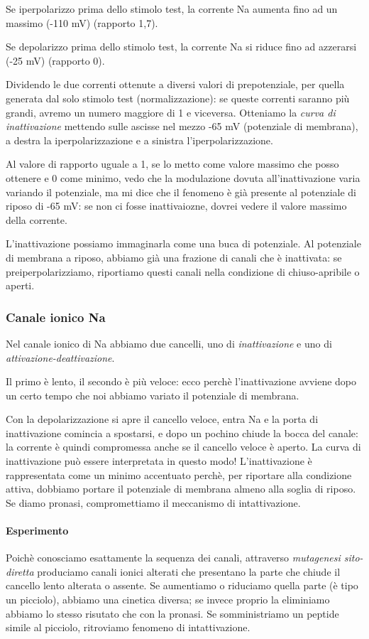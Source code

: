 \documentclass[a4paper,12pt]{article}
\begin{document}
Se iperpolarizzo prima dello stimolo test, la corrente Na aumenta fino ad un massimo (-110 mV) (rapporto 1,7).

Se depolarizzo prima dello stimolo test, la corrente Na si riduce fino ad azzerarsi (-25 mV) (rapporto 0).

Dividendo le due correnti ottenute a diversi valori di prepotenziale, per quella generata dal solo stimolo test  (normalizzazione): se queste correnti saranno più grandi, avremo un numero maggiore di 1 e viceversa.
Otteniamo la \emph{curva di inattivazione} mettendo sulle ascisse nel mezzo -65 mV (potenziale di membrana), a destra la iperpolarizzazione e a sinistra l'iperpolarizzazione.

Al valore di rapporto uguale a 1, se lo metto come valore massimo che posso ottenere e 0 come minimo, vedo che la modulazione dovuta all'inattivazione varia variando il potenziale,  ma mi dice che il fenomeno è già presente al potenziale di riposo di -65 mV: se non ci fosse inattivaiozne, dovrei vedere il valore massimo della corrente.

L'inattivazione possiamo immaginarla come una buca di potenziale. Al potenziale di membrana a riposo, abbiamo già una frazione di canali che è inattivata: se preiperpolarizziamo, riportiamo questi canali nella condizione di chiuso-apribile o aperti.

\subsubsection{Canale ionico Na}
Nel canale ionico di Na abbiamo due cancelli, uno di \emph{inattivazione} e uno di \emph{attivazione-deattivazione}.

Il primo è lento, il secondo è più veloce: ecco perchè l'inattivazione avviene dopo un certo tempo che noi abbiamo variato il potenziale di membrana.

Con la depolarizzazione si apre il cancello veloce, entra Na e la porta di inattivazione comincia a spostarsi, e dopo un pochino chiude la bocca del canale: la corrente è quindi compromessa anche se il cancello veloce è aperto. La curva di inattivazione può essere interpretata in questo modo! L'inattivazione è rappresentata come un minimo accentuato perchè, per riportare alla condizione attiva, dobbiamo portare il potenziale di membrana almeno alla soglia di riposo. Se diamo pronasi, compromettiamo il meccanismo di intattivazione.

\paragraph{Esperimento}
Poichè conosciamo esattamente la sequenza dei canali, attraverso \emph{mutagenesi sito-diretta} produciamo canali ionici alterati che presentano la parte che chiude il cancello lento alterata o assente. Se aumentiamo o riduciamo quella parte (è tipo un picciolo), abbiamo una cinetica diversa; se invece proprio la eliminiamo abbiamo lo stesso risutato che con la pronasi. Se somministriamo un peptide simile al picciolo, ritroviamo fenomeno di intattivazione.
\end{document}
